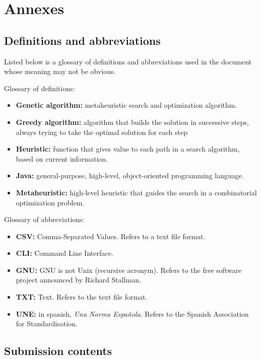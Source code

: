 \renewcommand{\documentname}{Annexes}

\chapter{Annexes}


\section{Definitions and abbreviations}

Listed below is a glossary of definitions and abbreviations used in the document whose meaning may not be obvious.

Glossary of definitions:

\begin{itemize}
    \item \textbf{Genetic algorithm:} metaheuristic search and optimization algorithm. 
    \item \textbf{Greedy algorithm:} algorithm that builds the solution in successive steps, always trying to take the optimal solution for each step
    \item \textbf{Heuristic:} function that gives value to each path in a search algorithm, based on current information.
    \item \textbf{Java:} general-purpose, high-level, object-oriented programming language.
    \item \textbf{Metaheuristic:} high-level heuristic that guides the search in a combinatorial optimization problem.
\end{itemize}

Glossary of abbreviations:

\begin{itemize}
    \item \textbf{CSV:} Comma-Separated Values. Refers to a text file format.
    \item \textbf{CLI:} Command Line Interface.
    \item \textbf{GNU:} GNU is not Unix (recursive acronym). Refers to the free software project announced by Richard Stallman.
    \item \textbf{TXT:} Text. Refers to the text file format.
    \item \textbf{UNE:} in spanish, \textit{Una Norma Española}. Refers to the Spanish Association for Standardisation.
\end{itemize}


\section{Submission contents}

